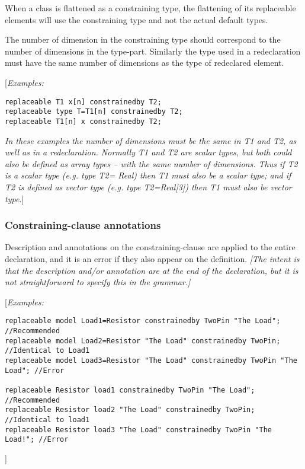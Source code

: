 When a class is flattened as a constraining type, the flattening of its
replaceable elements will use the constraining type and not the actual
default types.

The number of dimension in the constraining type should correspond to
the number of dimensions in the type-part. Similarly the type used in a
redeclaration must have the same number of dimensions as the type of
redeclared element.

{[}\emph{Examples:}
\begin{lstlisting}[language=modelica]
replaceable T1 x[n] constrainedby T2;
replaceable type T=T1[n] constrainedby T2;
replaceable T1[n] x constrainedby T2;
\end{lstlisting}

\emph{In these examples the number of dimensions must be the same in T1
and T2, as well as in a redeclaration. Normally T1 and T2 are scalar
types, but both could also be defined as array types -- with the same
number of dimensions. Thus if T2 is a scalar type (e.g. type T2= Real)
then T1 must also be a scalar type; and if T2 is defined as vector type
  (e.g. type T2=Real[3]) then T1 must also be vector type.}]
\subsubsection{Constraining-clause annotations}

Description and annotations on the constraining-clause are applied to
the entire declaration, and it is an error if they also appear on the
definition. \emph{{[}The intent is that the description and/or
annotation are at the end of the declaration, but it is not
straightforward to specify this in the grammar.{]}}

{[}\emph{Examples:}
\begin{lstlisting}[language=modelica]
replaceable model Load1=Resistor constrainedby TwoPin "The Load"; //Recommended
replaceable model Load2=Resistor "The Load" constrainedby TwoPin; //Identical to Load1
replaceable model Load3=Resistor "The Load" constrainedby TwoPin "The Load"; //Error

replaceable Resistor load1 constrainedby TwoPin "The Load"; //Recommended
replaceable Resistor load2 "The Load" constrainedby TwoPin; //Identical to load1
replaceable Resistor load3 "The Load" constrainedby TwoPin "The Load!"; //Error
\end{lstlisting}

{]}

